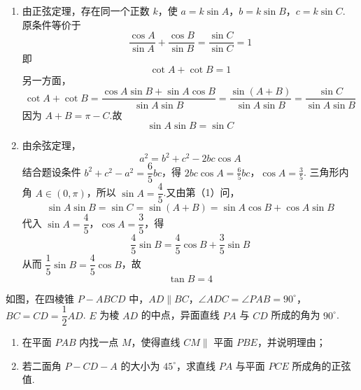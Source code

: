\begin{solution}
\begin{enumerate}
\item 由正弦定理，存在同一个正数 \(k\)，使
\(a=k\sin A\)，\(b=k\sin B\)，\(c=k\sin C\).
原条件等价于
\[
\frac{\cos A}{\sin A}+\frac{\cos B}{\sin B}
=\frac{\sin C}{\sin C}=1
\]
即
\[
\cot A+\cot B=1
\]
另一方面，
\[
\cot A+\cot B
=\frac{\cos A\sin B+\sin A\cos B}{\sin A\sin B}
=\frac{\sin(A+B)}{\sin A\sin B}
=\frac{\sin C}{\sin A\sin B}
\]
因为 \(A+B=\pi-C\).故
\[
\sin A\sin B=\sin C
\]

\item 由余弦定理，
\[
a^2=b^2+c^2-2bc\cos A
\]
结合题设条件 \(b^2+c^2-a^2=\dfrac65bc\)，得
\(2bc\cos A=\frac65bc\)，\(\cos A=\frac35\).
三角形内角 \(A\in(0,\pi)\)，所以 \(\sin A=\dfrac45\).又由第（1）问，
\[
\sin A\sin B=\sin C=\sin(A+B)
=\sin A\cos B+\cos A\sin B
\]
代入 \(\sin A=\dfrac45\)，\(\cos A=\dfrac35\)，得
\[
\frac45\sin B=\frac45\cos B+\frac35\sin B
\]
从而 \(\dfrac15\sin B=\dfrac45\cos B\)，故
\[
\tan B=4
\]
\end{enumerate}
\end{solution}


\begin{problem}
如图，在四棱锥 \(P-ABCD\) 中，\(AD\parallel BC\)，\(\angle ADC=\angle PAB=90^\circ\)，\(BC=CD=\dfrac12AD\). \(E\) 为棱 \(AD\) 的中点，异面直线 \(PA\) 与 \(CD\) 所成的角为 \(90^\circ\).

\begin{enumerate}
\item 在平面 \(PAB\) 内找一点 \(M\)，使得直线 \(CM\parallel\) 平面 \(PBE\)，并说明理由；
\item 若二面角 \(P-CD-A\) 的大小为 \(45^\circ\)，求直线 \(PA\) 与平面 \(PCE\) 所成角的正弦值.
\end{enumerate}

\end{problem}

